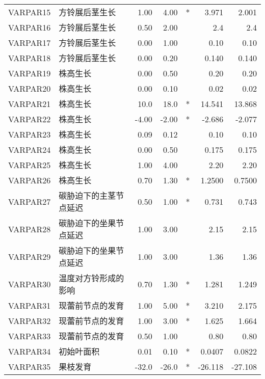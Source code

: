 \begin{longtable}{llrrcrr}
    VARPAR15 & 方铃展后茎生长             & 1.00   & 4.00   & *   & 3.971   & 2.001   \\
    VARPAR16 & 方铃展后茎生长             & 0.50   & 2.00   &     & 2.4     & 2.4     \\
    VARPAR17 & 方铃展后茎生长             & 0.00   & 1.00   &     & 0.10    & 0.10    \\
    VARPAR18 & 方铃展后茎生长             & 0.00   & 0.20   &     & 0.140   & 0.140   \\
    VARPAR19 & 株高生长                   & 0.00   & 0.50   &     & 0.20    & 0.20    \\
    VARPAR20 & 株高生长                   & 0.00   & 0.10   &     & 0.02    & 0.02    \\
    VARPAR21 & 株高生长                   & 10.0   & 18.0   & *   & 14.541  & 13.868  \\
    VARPAR22 & 株高生长                   & -4.00  & -2.00  & *   & -2.686  & -2.077  \\
    VARPAR23 & 株高生长                   & 0.09   & 0.12   &     & 0.10    & 0.10    \\
    VARPAR24 & 株高生长                   & 0.00   & 0.50   &     & 0.175   & 0.175   \\
    VARPAR25 & 株高生长                   & 1.00   & 4.00   &     & 2.20    & 2.20    \\
    VARPAR26 & 株高生长                   & 0.70   & 1.30   & *   & 1.2500  & 0.7500  \\
    VARPAR27 & 碳胁迫下的主茎节点延迟     & 0.50   & 1.00   & *   & 0.731   & 0.743   \\
    VARPAR28 & 碳胁迫下的坐果节点延迟     & 1.00   & 3.00   &     & 2.15    & 2.15    \\
    VARPAR29 & 碳胁迫下的坐果节点延迟     & 1.00   & 3.00   &     & 1.36    & 1.36    \\
    VARPAR30 & 温度对方铃形成的影响       & 0.70   & 1.30   & *   & 1.281   & 1.249   \\
    VARPAR31 & 现蕾前节点的发育           & 1.00   & 5.00   & *   & 3.210   & 2.175   \\
    VARPAR32 & 现蕾前节点的发育           & 1.00   & 3.00   & *   & 1.625   & 1.664   \\
    VARPAR33 & 现蕾前节点的发育           & 0.50   & 1.00   &     & 0.80    & 0.80    \\
    VARPAR34 & 初始叶面积                 & 0.01   & 0.10   & *   & 0.0407  & 0.0822  \\
    VARPAR35 & 果枝发育                   & -32.0  & -26.0  & *   & -26.118 & -27.108 \\

\end{longtable}

